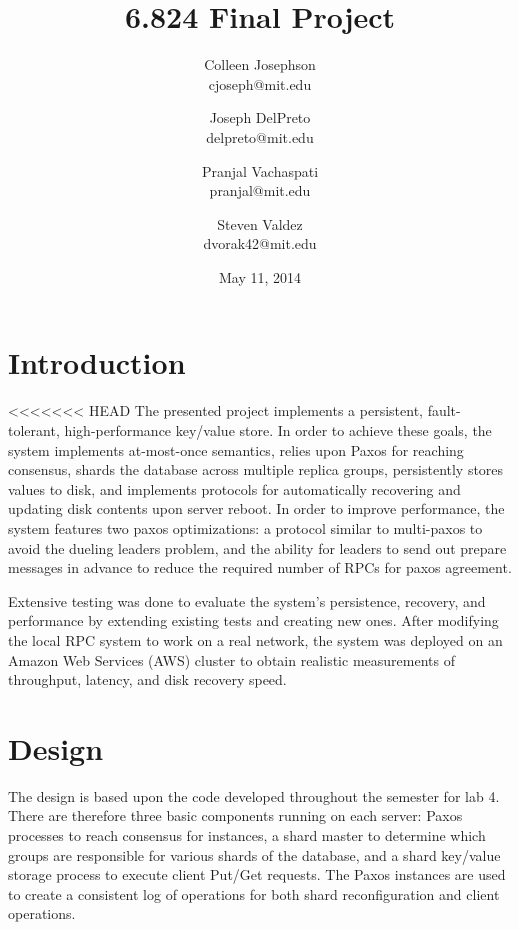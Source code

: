 \documentclass[letterpaper,10pt]{article}
\begin{document}
\title{\Large \bf 6.824 Final Project}
\author{
{\rm Colleen Josephson}\\
cjoseph@mit.edu
\and
{\rm Joseph DelPreto}\\
delpreto@mit.edu
\and
{\rm Pranjal Vachaspati}\\
pranjal@mit.edu
\and
{\rm Steven Valdez}\\
dvorak42@mit.edu
} %

\date{May 11, 2014}

\maketitle


\section{Introduction}
<<<<<<< HEAD
The presented project implements a persistent, fault-tolerant, high-performance key/value store. In order to achieve these goals, the system implements at-most-once semantics, relies upon Paxos for reaching consensus, shards the database across multiple replica groups, persistently stores values to disk, and implements protocols for automatically recovering and updating disk contents upon server reboot.  In order to improve performance, the system features two paxos optimizations: a protocol similar to multi-paxos to avoid the dueling leaders problem, and the ability for leaders to send out prepare messages in advance to reduce the required number of RPCs for paxos agreement.  

Extensive testing was done to evaluate the system's persistence, recovery, and performance by extending existing tests and creating new ones.  After modifying the local RPC system to work on a real network, the system was deployed on an Amazon Web Services (AWS) cluster to obtain realistic measurements of throughput, latency, and disk recovery speed.

\section{Design} \label{sec:design}
The design is based upon the code developed throughout the semester for lab 4.  There are therefore three basic components running on each server: Paxos processes to reach consensus for instances, a shard master to determine which groups are responsible for various shards of the database, and a shard key/value storage process to execute client Put/Get requests.  The Paxos instances are used to create a consistent log of operations for both shard reconfiguration and client operations.  
\end{document}
